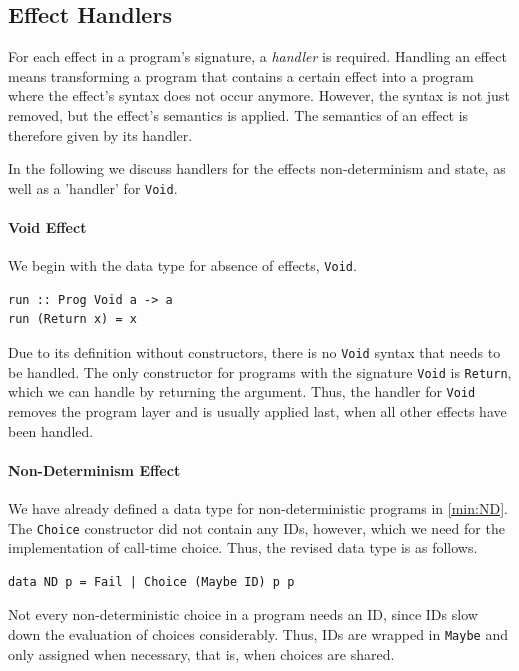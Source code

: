 \documentclass[a4paper, 11pt, fleqn, twoside, abstract=on]{scrreprt}
\newcommand{\hinl}[1]{\texttt{#1}}
\begin{document}
\subsection{Effect Handlers}
\label{subsec:effectHandlers}
For each effect in a program's signature, a \textit{handler} is required.
Handling an effect means transforming a program that contains a certain effect into a program where the effect's syntax does not occur anymore.
However, the syntax is not just removed, but the effect's semantics is applied.
The semantics of an effect is therefore given by its handler.

In the following we discuss handlers for the effects non-determinism and state, as well as a 'handler' for \hinl{Void}.

\paragraph{Void Effect}
We begin with the data type for absence of effects, \hinl{Void}.

\begin{verbatim}
run :: Prog Void a -> a
run (Return x) = x
\end{verbatim}
\noindent
Due to its definition without constructors, there is no \hinl{Void} syntax that needs to be handled.
The only constructor for programs with the signature \hinl{Void} is \hinl{Return}, which we can handle by returning the argument.
Thus, the handler for \hinl{Void} removes the program layer and is usually applied last, when all other effects have been handled.

\paragraph{Non-Determinism Effect}
We have already defined a data type for non-deterministic programs in \autoref{min:ND}.
The \hinl{Choice} constructor did not contain any IDs, however, which we need for the implementation of call-time choice.
Thus, the revised data type is as follows.

\begin{verbatim}
data ND p = Fail | Choice (Maybe ID) p p
\end{verbatim}

Not every non-deterministic choice in a program needs an ID, since IDs slow down the evaluation of choices considerably.
Thus, IDs are wrapped in \hinl{Maybe} and only assigned when necessary, that is, when choices are shared.
\end{document}
